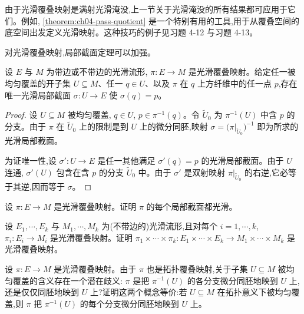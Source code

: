 \documentclass[../../main.tex]{subfiles}
\begin{document}
由于光滑覆叠映射是满射光滑淹没,上一节关于光滑淹没的所有结果都可应用于它们。例如, \cref{theorem:ch04-pass-quotient} 是一个特别有用的工具,用于从覆叠空间的底空间出发定义光滑映射。这种技巧的例子见习题 4-12 与习题 4-13。

对光滑覆叠映射,局部截面定理可以加强。

\begin{proposition}\label{proposition:ch04-local-section-covering}
设 $E$ 与 $M$ 为带边或不带边的光滑流形, $\pi:E\to M$ 是光滑覆叠映射。给定任一被均匀覆盖的开子集 $U\subseteq M$、任一 $q\in U$、以及 $\pi$ 在 $q$ 上方纤维中的任一点 $p$,存在唯一光滑局部截面 $\sigma:U\to E$ 使 $\sigma(q)=p$。
\end{proposition}

\begin{proof}
设 $U\subseteq M$ 被均匀覆盖, $q\in U$, $p\in\pi^{-1}(q)$。令 $\widetilde{U}_0$ 为 $\pi^{-1}(U)$ 中含 $p$ 的分支。由于 $\pi$ 在 $\widetilde{U}_0$ 上的限制是到 $U$ 上的微分同胚,映射 $\sigma=\bigl(\pi|_{\widetilde{U}_0}\bigr)^{-1}$ 即为所求的光滑局部截面。

为证唯一性,设 $\sigma':U\to E$ 是任一其他满足 $\sigma'(q)=p$ 的光滑局部截面。由于 $U$ 连通, $\sigma'(U)$ 包含在含 $p$ 的分支 $\widetilde{U}_0$ 中。由于 $\sigma'$ 是双射映射 $\pi|_{\widetilde{U}_0}$ 的右逆,它必等于其逆,因而等于 $\sigma$。
\end{proof}

\begin{exercise}\label{exercise:ch04-covering-section-smooth}
设 $\pi:E\to M$ 是光滑覆叠映射。证明 $\pi$ 的每个局部截面都光滑。
\end{exercise}

\begin{exercise}\label{exercise:ch04-product-coverings}
设 $E_1,\cdots ,E_k$ 与 $M_1,\cdots ,M_k$ 为(不带边的)光滑流形,且对每个 $i=1,\cdots ,k$, $\pi_i:E_i\to M_i$ 是光滑覆叠映射。证明 $\pi_1\times\cdots\times\pi_k:E_1\times\cdots\times E_k\to M_1\times\cdots\times M_k$ 是光滑覆叠映射。
\end{exercise}

\begin{exercise}\label{exercise:ch04-evenly-covered-equiv}
设 $\pi:E\to M$ 是光滑覆叠映射。由于 $\pi$ 也是拓扑覆叠映射,关于子集 $U\subseteq M$ 被均匀覆盖的含义存在一个潜在歧义: $\pi$ 是把 $\pi^{-1}(U)$ 的各分支微分同胚地映到 $U$ 上,还是仅仅同胚地映到 $U$ 上?证明这两个概念等价:若 $U\subseteq M$ 在拓扑意义下被均匀覆盖,则 $\pi$ 把 $\pi^{-1}(U)$ 的每个分支微分同胚地映到 $U$ 上。
\end{exercise}
\end{document}
